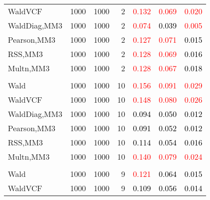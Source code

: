 \documentclass[
]{article}
\begin{document}
\begin{table}[H]
{\begin{tabular}[t]{lrrrrrr}
\hspace{1em}WaldVCF & 1000 & 1000 & 2 & \textcolor{red}{0.132} & \textcolor{red}{0.069} & \textcolor{red}{0.020}\\
\hspace{1em}WaldDiag,MM3 & 1000 & 1000 & 2 & \textcolor{red}{0.074} & \textcolor{black}{0.039} & \textcolor{red}{0.005}\\
\hspace{1em}Pearson,MM3 & 1000 & 1000 & 2 & \textcolor{red}{0.127} & \textcolor{red}{0.071} & \textcolor{black}{0.015}\\
\hspace{1em}RSS,MM3 & 1000 & 1000 & 2 & \textcolor{red}{0.128} & \textcolor{red}{0.069} & \textcolor{black}{0.016}\\
\hspace{1em}Multn,MM3 & 1000 & 1000 & 2 & \textcolor{red}{0.128} & \textcolor{red}{0.067} & \textcolor{black}{0.018}\\
\addlinespace[0.3em]
\multicolumn{7}{l}{\textbf{1F 15V}}\\
\hspace{1em}Wald & 1000 & 1000 & 10 & \textcolor{red}{0.156} & \textcolor{red}{0.091} & \textcolor{red}{0.029}\\
\hspace{1em}WaldVCF & 1000 & 1000 & 10 & \textcolor{red}{0.148} & \textcolor{red}{0.080} & \textcolor{red}{0.026}\\
\hspace{1em}WaldDiag,MM3 & 1000 & 1000 & 10 & \textcolor{black}{0.094} & \textcolor{black}{0.050} & \textcolor{black}{0.012}\\
\hspace{1em}Pearson,MM3 & 1000 & 1000 & 10 & \textcolor{black}{0.091} & \textcolor{black}{0.052} & \textcolor{black}{0.012}\\
\hspace{1em}RSS,MM3 & 1000 & 1000 & 10 & \textcolor{black}{0.114} & \textcolor{black}{0.054} & \textcolor{black}{0.016}\\
\hspace{1em}Multn,MM3 & 1000 & 1000 & 10 & \textcolor{red}{0.140} & \textcolor{red}{0.079} & \textcolor{red}{0.024}\\
\addlinespace[0.3em]
\multicolumn{7}{l}{\textbf{2F 10V}}\\
\hspace{1em}Wald & 1000 & 1000 & 9 & \textcolor{red}{0.121} & \textcolor{black}{0.064} & \textcolor{black}{0.015}\\
\hspace{1em}WaldVCF & 1000 & 1000 & 9 & \textcolor{black}{0.109} & \textcolor{black}{0.056} & \textcolor{black}{0.014}\\

\end{tabular}}
\end{table}
\end{document}
